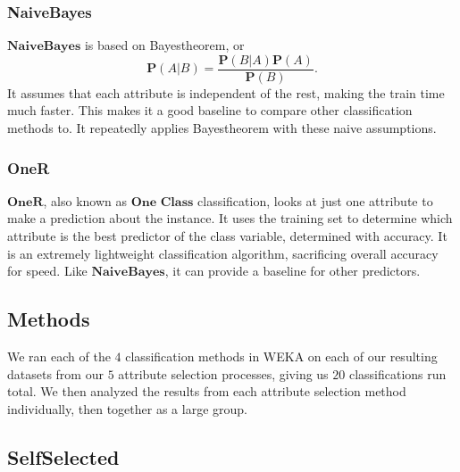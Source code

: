 \documentclass[12pt]{article}
\begin{document}
\subsubsection{NaiveBayes}
$\textbf{NaiveBayes}$ is based on Bayes\textquotesingle  theorem, or $$\textbf{P}(A|B) = \frac{\textbf{P}(B|A)\textbf{P}(A)}{\textbf{P}(B)}.$$ It assumes that each attribute is independent of the rest, making the train time much faster. This makes it a good baseline to compare other classification methods to. It repeatedly applies Bayes\textquotesingle  theorem with these naive assumptions. 

\subsubsection{OneR}
$\textbf{OneR}$, also known as $\textbf{One Class}$ classification, looks at just one attribute to make a prediction about the instance. It uses the training set to determine which attribute is the best predictor of the class variable, determined with accuracy. It is an extremely lightweight classification algorithm, sacrificing overall accuracy for speed. Like $\textbf{NaiveBayes}$, it can provide a baseline for other predictors. 

\subsection{Methods}
We ran each of the $4$ classification methods in WEKA on each of our resulting datasets from our $5$ attribute selection processes, giving us $20$ classifications run total. We then analyzed the results from each attribute selection method individually, then together as a large group. 

\subsection{SelfSelected}
\end{document}
